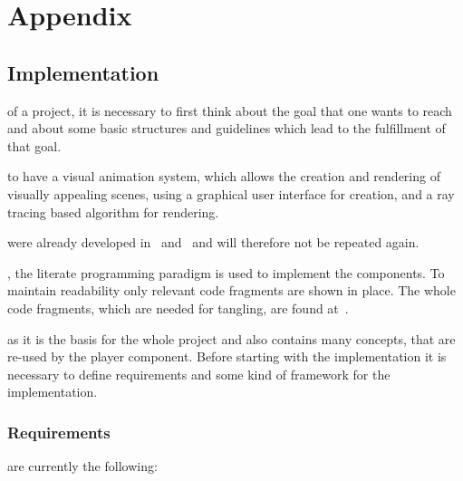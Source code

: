 \documentclass[%
    a4paper,    %
    justified,  %
    nobib,      %
    openany     %
]{tufte-book}
\begin{document}

\appendix
\part*{Appendix}
\label{part:appendix}


\chapter{Implementation}
\label{appendix:chap:implementation}

 of a project, it is necessary to
first think about the goal that one wants to reach and about some basic
structures and guidelines which lead to the fulfillment of that goal.

 to have a visual animation system, which allows
the creation and rendering of visually appealing scenes, using a graphical user
interface for creation, and a ray tracing based algorithm for
rendering.~

 were already developed
in~ and~ and will
therefore not be repeated again.

, the literate programming
paradigm is used to implement the components. To maintain readability only
relevant code fragments are shown in place. The whole code fragments, which are
needed for tangling, are found at~.

 as it is the basis for the
whole project and also contains many concepts, that are re-used by the player
component. Before starting with the implementation it is necessary to define
requirements and some kind of framework for the implementation.


\section{Requirements}
\label{appendix:sec:requirements}

 are currently the
following:
\end{document}
